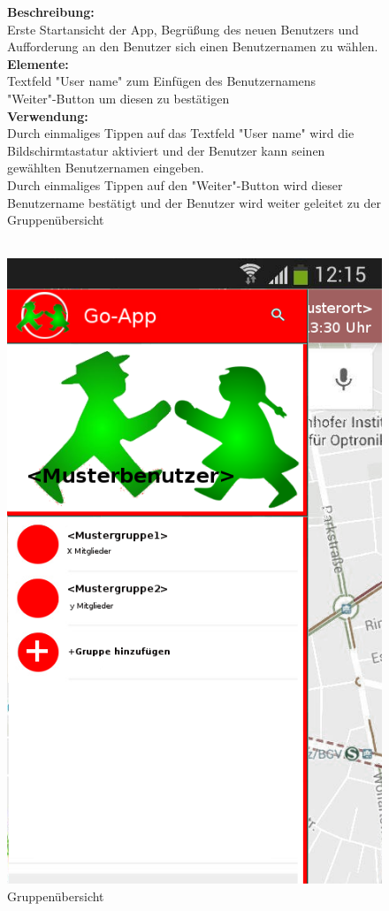 \begin{figure} [H]
{	\textbf{Beschreibung:}\\
	Erste Startansicht der App, Begrüßung des neuen Benutzers und Aufforderung an den Benutzer sich einen Benutzernamen zu wählen.\\
	\textbf{Elemente:}\\
	Textfeld "User name" zum Einfügen des Benutzernamens\\
	"Weiter"-Button um diesen zu bestätigen\\
	\textbf{Verwendung:}\\
	Durch einmaliges Tippen auf das Textfeld "User name" wird die Bildschirmtastatur aktiviert und der Benutzer kann seinen gewählten Benutzernamen eingeben.\\
	Durch einmaliges Tippen auf den "Weiter"-Button wird dieser Benutzername bestätigt und der Benutzer wird weiter geleitet zu der Gruppenübersicht\\ \\
}
\end{figure}

\begin{figure} [H]
	\caption{Gruppenübersicht}
\begin{center}
	\includegraphics[scale = 0.5]{resources/images/gruppenuebersicht.png}
\end{center}
\end{figure}

